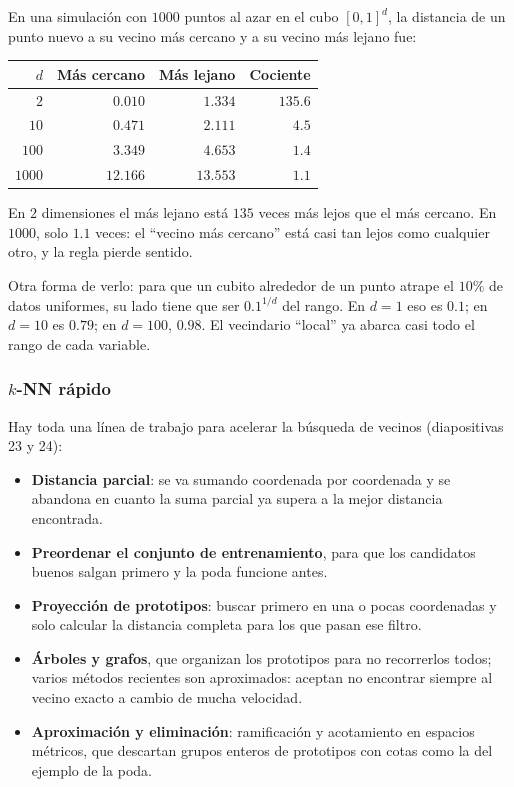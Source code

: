 \documentclass[11pt,letterpaper]{article}
\begin{document}
\begin{ejemplo}
    En una simulación con $1000$ puntos al azar en el cubo $[0, 1]^d$,
    la distancia de un punto nuevo a su vecino más cercano y a su
    vecino más lejano fue:
    \begin{center}
    \begin{tabular}{rrrr}
        \toprule
        $d$ & \textbf{Más cercano} & \textbf{Más lejano}
          & \textbf{Cociente} \\
        \midrule
           $2$ &  $0.010$ &  $1.334$ & $135.6$ \\
          $10$ &  $0.471$ &  $2.111$ &   $4.5$ \\
         $100$ &  $3.349$ &  $4.653$ &   $1.4$ \\
        $1000$ & $12.166$ & $13.553$ &   $1.1$ \\
        \bottomrule
    \end{tabular}
    \end{center}
    En $2$ dimensiones el más lejano está $135$ veces más lejos que el
    más cercano. En $1000$, solo $1.1$ veces: el ``vecino más
    cercano'' está casi tan lejos como cualquier otro, y la regla
    pierde sentido.

    Otra forma de verlo: para que un cubito alrededor de un punto
    atrape el $10\%$ de datos uniformes, su lado tiene que ser
    $0.1^{1/d}$ del rango. En $d = 1$ eso es $0.1$; en $d = 10$ es
    $0.79$; en $d = 100$, $0.98$. El vecindario ``local'' ya abarca casi
    todo el rango de cada variable.
\end{ejemplo}

\subsubsection*{$k$-NN rápido}

Hay toda una línea de trabajo para acelerar la búsqueda de vecinos
(diapositivas 23 y 24):

\begin{itemize}[itemsep=0.3em]
    \item \textbf{Distancia parcial}: se va sumando coordenada por
          coordenada y se abandona en cuanto la suma parcial ya supera
          a la mejor distancia encontrada.
    \item \textbf{Preordenar el conjunto de entrenamiento}, para que
          los candidatos buenos salgan primero y la poda funcione
          antes.
    \item \textbf{Proyección de prototipos}: buscar primero en una o
          pocas coordenadas y solo calcular la distancia completa para
          los que pasan ese filtro.
    \item \textbf{Árboles y grafos}, que organizan los prototipos para
          no recorrerlos todos; varios métodos recientes son
          aproximados: aceptan no encontrar siempre al vecino exacto a
          cambio de mucha velocidad.
    \item \textbf{Aproximación y eliminación}: ramificación y acotamiento
          en espacios métricos, que descartan grupos enteros de
          prototipos con cotas como la del ejemplo de la poda.
\end{itemize}
\end{document}
